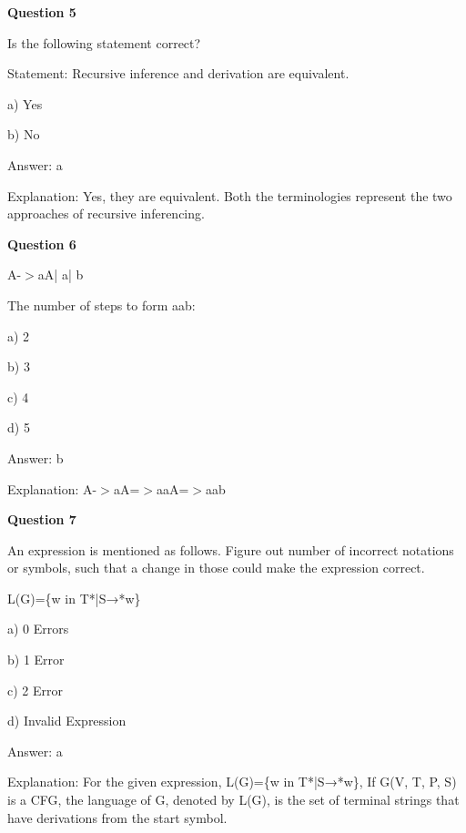 \documentclass{article}
\begin{document}
\begin{mdframed}[linewidth=1pt, roundcorner=5pt, linecolor=gray!30, backgroundcolor=gray!5]
\textbf{Question 5} 

Is the following statement correct?

Statement: Recursive inference and derivation are equivalent.

a) Yes

b) No
\vspace{5pt} \par
\begin{tcolorbox}[colback=green!5, colframe=green!40!black, title=Solution]
Answer: a

Explanation: Yes, they are equivalent. Both the terminologies represent the two approaches of recursive inferencing.
\end{tcolorbox}
\end{mdframed}

\begin{mdframed}[linewidth=1pt, roundcorner=5pt, linecolor=gray!30, backgroundcolor=gray!5]
\textbf{Question 6} 

A-$>$aA| a| b

The number of steps to form aab:

a) 2

b) 3

c) 4

d) 5
\vspace{5pt} \par
\begin{tcolorbox}[colback=green!5, colframe=green!40!black, title=Solution]
Answer: b

Explanation: A-$>$aA=$>$aaA=$>$aab
\end{tcolorbox}
\end{mdframed}
\newpage

\begin{mdframed}[linewidth=1pt, roundcorner=5pt, linecolor=gray!30, backgroundcolor=gray!5]
\textbf{Question 7} 

An expression is mentioned as follows. Figure out number of incorrect notations or symbols, such that a change in those could make the expression correct.

L(G)=\{w in T*|S→*w\}

a) 0 Errors

b) 1 Error

c) 2 Error

d) Invalid Expression
\vspace{5pt} \par
\begin{tcolorbox}[colback=green!5, colframe=green!40!black, title=Solution]
Answer: a

Explanation: For the given expression, L(G)=\{w in T*|S→*w\}, If G(V, T, P, S) is a CFG, the language of G, denoted by L(G), is the set of terminal strings that have derivations from the start symbol.
\end{tcolorbox}
\end{mdframed}
\end{document}

